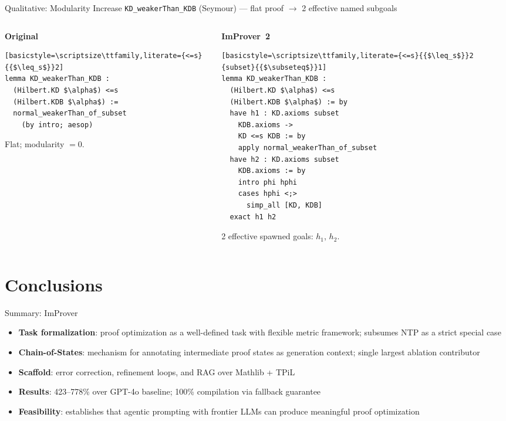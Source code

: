 \documentclass{beamer}
\begin{document}
\begin{frame}[fragile]{Qualitative: Modularity Increase}
\vspace{0.2em}
{\small \texttt{KD\_weakerThan\_KDB} (Seymour) --- flat proof $\to$ 2 effective named subgoals}
\begin{columns}[T]
\begin{column}{0.40\textwidth}
\textbf{Original}
\begin{lstlisting}[basicstyle=\scriptsize\ttfamily,literate={<=s}{{$\leq_s$}}2]
lemma KD_weakerThan_KDB :
  (Hilbert.KD $\alpha$) <=s
  (Hilbert.KDB $\alpha$) :=
  normal_weakerThan_of_subset
    (by intro; aesop)
\end{lstlisting}
\small Flat; modularity $= 0$.
\end{column}
\begin{column}{0.57\textwidth}
\textbf{ImProver~2}
\begin{lstlisting}[basicstyle=\scriptsize\ttfamily,literate={<=s}{{$\leq_s$}}2 {subset}{{$\subseteq$}}1]
lemma KD_weakerThan_KDB :
  (Hilbert.KD $\alpha$) <=s
  (Hilbert.KDB $\alpha$) := by
  have h1 : KD.axioms subset
    KDB.axioms ->
    KD <=s KDB := by
    apply normal_weakerThan_of_subset
  have h2 : KD.axioms subset
    KDB.axioms := by
    intro phi hphi
    cases hphi <;>
      simp_all [KD, KDB]
  exact h1 h2
\end{lstlisting}
\small 2 effective spawned goals: $h_1$, $h_2$.
\end{column}
\end{columns}
\end{frame}

\section{Conclusions}

\begin{frame}{Summary: ImProver}
\vspace{0.5em}
\begin{itemize}\setlength{\itemsep}{8pt}
  \item \textbf{Task formalization}: proof optimization as a well-defined task with flexible metric framework; subsumes NTP as a strict special case
  \item \textbf{Chain-of-States}: mechanism for annotating intermediate proof states as generation context; single largest ablation contributor
  \item \textbf{Scaffold}: error correction, refinement loops, and RAG over Mathlib + TPiL
  \item \textbf{Results}: 423--778\% over GPT-4o baseline; 100\% compilation via fallback guarantee
  \item \textbf{Feasibility}: establishes that agentic prompting with frontier LLMs can produce meaningful proof optimization
\end{itemize}
\end{frame}
\end{document}

